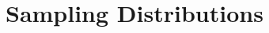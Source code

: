 \documentclass[../main.tex]{subfiles}
\begin{document}
\chapter{Sampling Distributions}
\end{document}
